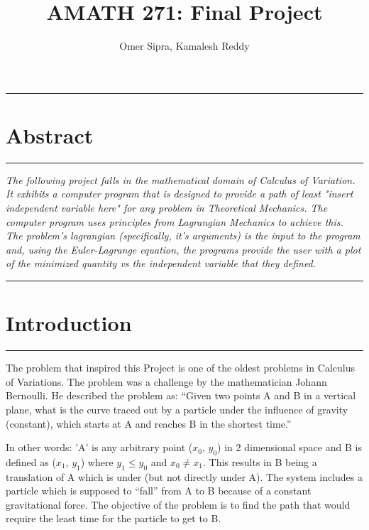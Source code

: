 \documentclass[hidelinks, 11pt]{article}
\title{AMATH 271: Final Project}
\author{Omer Sipra, Kamalesh Reddy}
\begin{document}
\maketitle

\begin{center}
  \noindent\rule{16cm}{0.4pt}
  \section*{Abstract} %
  \noindent\rule{16cm}{0.4pt}
\end{center}

\begin{changemargin}{1cm}{1cm}
\textit{The following project falls in the mathematical domain of Calculus of Variation. It exhibits a computer program that is designed to provide a path of least "insert independent variable here" for any problem in Theoretical Mechanics. The computer program uses principles from Lagrangian Mechanics to achieve this. The problem’s lagrangian (specifically, it's arguments) is the input to the program and, using the Euler-Lagrange equation, the programs provide the user with a plot of the minimized quantity vs the independent variable that they defined.}
\end{changemargin}

\begin{center}
  \noindent\rule{16cm}{0.4pt}
  \section*{Introduction} %
  \noindent\rule{16cm}{0.4pt}
\end{center}

The problem that inspired this Project is one of the oldest problems in Calculus of Variations. The problem was a challenge by the mathematician Johann Bernoulli. He described the problem as:
“Given two points A and B in a vertical plane, what is the curve traced out by a particle under the influence of gravity (constant), which starts at A and reaches B in the shortest time.”

In other words: 'A' is any arbitrary point ($x_{0}$, $y_{0}$) in 2 dimensional space and B is defined as ($x_{1}$, $y_{1}$) where $y_{1} \leq y_{0}$ and $x_{0} \neq x_{1}$. This results in B being a translation of A which is under (but not directly under A). The system includes a particle which is supposed to “fall” from A to B because of a constant gravitational force. The objective of the problem is to find the path that would require the least time for the particle to get to B. 
\end{document}
